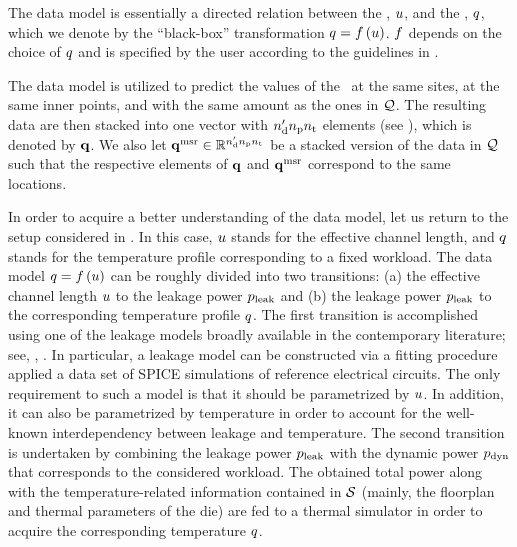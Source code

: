 The data model is essentially a directed relation between the \qoi, $u$, and the \qom, $q$, which we denote by the ``black-box'' transformation $\q = \oBB{\u}$.
$\oBB$ depends on the choice of $q$ and is specified by the user according to the guidelines in .

The data model is utilized to predict the values of the \qom\ at the same sites, at the same inner points, and with the same amount as the ones in $\mathcal{Q}$.
The resulting data are then stacked into one vector with ${n_\text{d}'} {n_\text{p}} {n_\text{t}}$ elements (see ), which is denoted by $\mathbf{q}$.
We also let $\mathbf{q}^{\text{msr}} \in \mathbb{R}^{{n_\text{d}'} {n_\text{p}} {n_\text{t}}}$ be a stacked version of the data in $\mathcal{Q}$ such that the respective elements of $\mathbf{q}$ and $\mathbf{q}^{\text{msr}}$ correspond to the same locations.

In order to acquire a better understanding of the data model, let us return to the setup considered in .
In this case, $u$ stands for the effective channel length, and $q$ stands for the temperature profile corresponding to a fixed workload.
The data model $\q = \oBB{\u}$ can be roughly divided into two transitions: (a) the effective channel length $u$ to the leakage power $p_{\text{leak}}$ and (b) the leakage power $p_{\text{leak}}$ to the corresponding temperature profile $q$.
The first transition is accomplished using one of the leakage models broadly available in the contemporary literature; see, \eg, \cite{chandrakasan2001, srivastava2010, juan2012}.
In particular, a leakage model can be constructed via a fitting procedure applied a data set of SPICE simulations of reference electrical circuits.
The only requirement to such a model is that it should be parametrized by $u$.
In addition, it can also be parametrized by temperature in order to account for the well-known interdependency between leakage and temperature.
The second transition is undertaken by combining the leakage power $p_{\text{leak}}$ with the dynamic power $p_{\text{dyn}}$ that corresponds to the considered workload.
The obtained total power along with the temperature-related information contained in $\mathcal{S}$ (mainly, the floorplan and thermal parameters of the die) are fed to a thermal simulator in order to acquire the corresponding temperature $q$.
